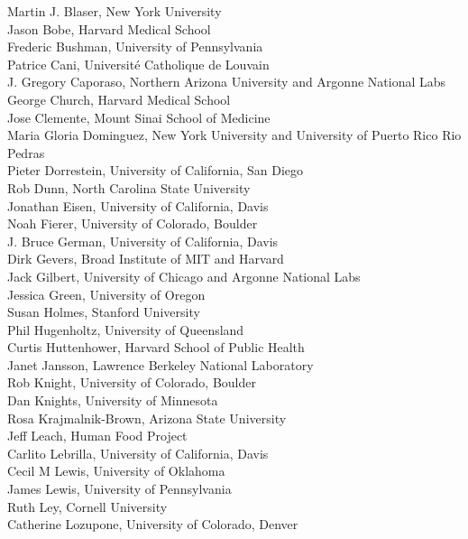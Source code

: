 \documentclass[10pt,letterpaper]{article}
\begin{document}
\parbox[t]{0.623\textwidth}{
\scriptsize{
Martin J. Blaser, New York University\\
Jason Bobe, Harvard Medical School\\
Frederic Bushman, University of Pennsylvania\\
Patrice Cani, Universit\'e Catholique de Louvain\\
J. Gregory Caporaso, Northern Arizona University and Argonne National Labs\\
George Church, Harvard Medical School\\
Jose Clemente, Mount Sinai School of Medicine\\
Maria Gloria Dominguez, New York University and University of Puerto Rico Rio Pedras\\
Pieter Dorrestein, University of California, San Diego\\
Rob Dunn, North Carolina State University\\
Jonathan Eisen, University of California, Davis\\
Noah Fierer, University of Colorado, Boulder\\
J. Bruce German, University of California, Davis\\
Dirk Gevers, Broad Institute of MIT and Harvard\\
Jack Gilbert, University of Chicago and Argonne National Labs\\
Jessica Green, University of Oregon\\
Susan Holmes, Stanford University\\
Phil Hugenholtz, University of Queensland\\
Curtis Huttenhower, Harvard School of Public Health\\
Janet Jansson, Lawrence Berkeley National Laboratory\\
Rob Knight, University of Colorado, Boulder\\
Dan Knights, University of Minnesota\\
Rosa Krajmalnik-Brown, Arizona State University\\
Jeff Leach, Human Food Project\\
Carlito Lebrilla, University of California, Davis\\
Cecil M Lewis, University of Oklahoma\\
James Lewis, University of Pennsylvania\\
Ruth Ley, Cornell University\\
Catherine Lozupone, University of Colorado, Denver\\
}}
\end{document}
